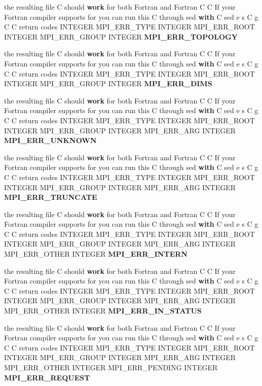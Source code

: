 \begin{CompactItemize}
\item 
the resulting file C should {\bf work} for both Fortran and Fortran C C If your Fortran compiler supports for you can run this C through sed {\bf with} C sed e s C g C C return codes INTEGER MPI\_\-ERR\_\-TYPE INTEGER MPI\_\-ERR\_\-ROOT INTEGER MPI\_\-ERR\_\-GROUP INTEGER {\bf MPI\_\-ERR\_\-TOPOLOGY}
\item 
the resulting file C should {\bf work} for both Fortran and Fortran C C If your Fortran compiler supports for you can run this C through sed {\bf with} C sed e s C g C C return codes INTEGER MPI\_\-ERR\_\-TYPE INTEGER MPI\_\-ERR\_\-ROOT INTEGER MPI\_\-ERR\_\-GROUP INTEGER {\bf MPI\_\-ERR\_\-DIMS}
\item 
the resulting file C should {\bf work} for both Fortran and Fortran C C If your Fortran compiler supports for you can run this C through sed {\bf with} C sed e s C g C C return codes INTEGER MPI\_\-ERR\_\-TYPE INTEGER MPI\_\-ERR\_\-ROOT INTEGER MPI\_\-ERR\_\-GROUP INTEGER MPI\_\-ERR\_\-ARG INTEGER {\bf MPI\_\-ERR\_\-UNKNOWN}
\item 
the resulting file C should {\bf work} for both Fortran and Fortran C C If your Fortran compiler supports for you can run this C through sed {\bf with} C sed e s C g C C return codes INTEGER MPI\_\-ERR\_\-TYPE INTEGER MPI\_\-ERR\_\-ROOT INTEGER MPI\_\-ERR\_\-GROUP INTEGER MPI\_\-ERR\_\-ARG INTEGER {\bf MPI\_\-ERR\_\-TRUNCATE}
\item 
the resulting file C should {\bf work} for both Fortran and Fortran C C If your Fortran compiler supports for you can run this C through sed {\bf with} C sed e s C g C C return codes INTEGER MPI\_\-ERR\_\-TYPE INTEGER MPI\_\-ERR\_\-ROOT INTEGER MPI\_\-ERR\_\-GROUP INTEGER MPI\_\-ERR\_\-ARG INTEGER MPI\_\-ERR\_\-OTHER INTEGER {\bf MPI\_\-ERR\_\-INTERN}
\item 
the resulting file C should {\bf work} for both Fortran and Fortran C C If your Fortran compiler supports for you can run this C through sed {\bf with} C sed e s C g C C return codes INTEGER MPI\_\-ERR\_\-TYPE INTEGER MPI\_\-ERR\_\-ROOT INTEGER MPI\_\-ERR\_\-GROUP INTEGER MPI\_\-ERR\_\-ARG INTEGER MPI\_\-ERR\_\-OTHER INTEGER {\bf MPI\_\-ERR\_\-IN\_\-STATUS}
\item 
the resulting file C should {\bf work} for both Fortran and Fortran C C If your Fortran compiler supports for you can run this C through sed {\bf with} C sed e s C g C C return codes INTEGER MPI\_\-ERR\_\-TYPE INTEGER MPI\_\-ERR\_\-ROOT INTEGER MPI\_\-ERR\_\-GROUP INTEGER MPI\_\-ERR\_\-ARG INTEGER MPI\_\-ERR\_\-OTHER INTEGER MPI\_\-ERR\_\-PENDING INTEGER {\bf MPI\_\-ERR\_\-REQUEST}

\end{CompactItemize}
